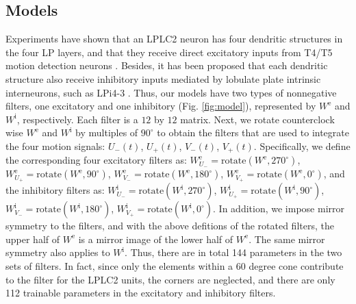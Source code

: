 \documentclass[9pt,lineno]{elife}
\begin{document}
\subsection{Models}
Experiments have shown that an LPLC2 neuron has four dendritic structures in the four LP layers, and that they receive direct excitatory inputs from T4/T5 motion detection neurons \citep{maisak2013directional,klapoetke2017ultra}. Besides, it has been proposed that each dendritic structure also receive inhibitory inputs mediated by lobulate plate intrinsic interneurons, such as LPi4-3 \citep{klapoetke2017ultra}. Thus, our models have two types of nonnegative filters, one excitatory and one inhibitory (Fig. \ref{fig:model}), represented by $W^{\text{e}}$ and $W^{\text{i}}$, respectively. Each filter is a $12$ by $12$ matrix. Next, we rotate counterclock wise $W^{\text{e}}$ and $W^{\text{i}}$ by multiples of $90^{\circ}$ to obtain the filters that are used to integrate the four motion signals: $U_{-}(t)$, $U_{+}(t)$, $V_{-}(t)$, $V_{+}(t)$. Specifically, we define the corresponding four excitatory filters as: $W^{\text{e}}_{U_{-}}=\text{rotate}(W^{\text{e}},270^{\circ})$, $W^{\text{e}}_{U_{+}}=\text{rotate}(W^{\text{e}},90^{\circ})$, $W^{\text{e}}_{V_{-}}=\text{rotate}(W^{\text{e}},180^{\circ})$, $W^{\text{e}}_{V_{+}}=\text{rotate}(W^{\text{e}},0^{\circ})$, and the inhibitory filters as: $W^{\text{i}}_{U_{-}}=\text{rotate}(W^{\text{i}},270^{\circ})$, $W^{\text{i}}_{U_{+}}=\text{rotate}(W^{\text{i}},90^{\circ})$, $W^{\text{i}}_{V_{-}}=\text{rotate}(W^{\text{i}},180^{\circ})$, $W^{\text{i}}_{V_{+}}=\text{rotate}(W^{\text{i}},0^{\circ})$. In addition, we impose mirror symmetry to the filters, and with the above defitions of the rotated filters, the upper half of $W^{\text{e}}$ is a mirror image of the lower half of $W^{\text{e}}$. The same mirror symmetry also applies to $W^{\text{i}}$. Thus, there are in total 144 parameters in the two sets of filters. In fact, since only the elements within a 60 degree cone contribute to the filter for the LPLC2 units, the corners are neglected, and there are only 112 trainable parameters in the excitatory and inhibitory filters. 


 
\end{document}
